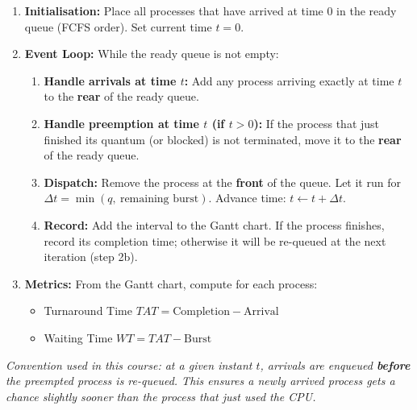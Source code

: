 \documentclass[11pt]{article}
\begin{document}
\begin{methode}
\begin{enumerate}
\item \textbf{Initialisation:} Place all processes that have arrived at time 0 in the ready queue (FCFS order). Set current time $t=0$.
\item \textbf{Event Loop:} While the ready queue is not empty:
  \begin{enumerate}
  \item \textbf{Handle arrivals at time $t$:} Add any process arriving exactly at time $t$ to the \textbf{rear} of the ready queue.
  \item \textbf{Handle preemption at time $t$ (if $t>0$):} If the process that just finished its quantum (or blocked) is not terminated, move it to the \textbf{rear} of the ready queue.
  \item \textbf{Dispatch:} Remove the process at the \textbf{front} of the queue. Let it run for $\Delta t = \min(q,\ \text{remaining burst})$. Advance time: $t \leftarrow t + \Delta t$.
  \item \textbf{Record:} Add the interval to the Gantt chart. If the process finishes, record its completion time; otherwise it will be re-queued at the next iteration (step 2b).
  \end{enumerate}
\item \textbf{Metrics:} From the Gantt chart, compute for each process:
  \begin{itemize}
  \item Turnaround Time $TAT = \text{Completion} - \text{Arrival}$
  \item Waiting Time $WT = TAT - \text{Burst}$
  \end{itemize}
\end{enumerate}
\emph{Convention used in this course: at a given instant $t$, arrivals are enqueued \textbf{before} the preempted process is re-queued. This ensures a newly arrived process gets a chance slightly sooner than the process that just used the CPU.}
\end{methode}
\end{document}
